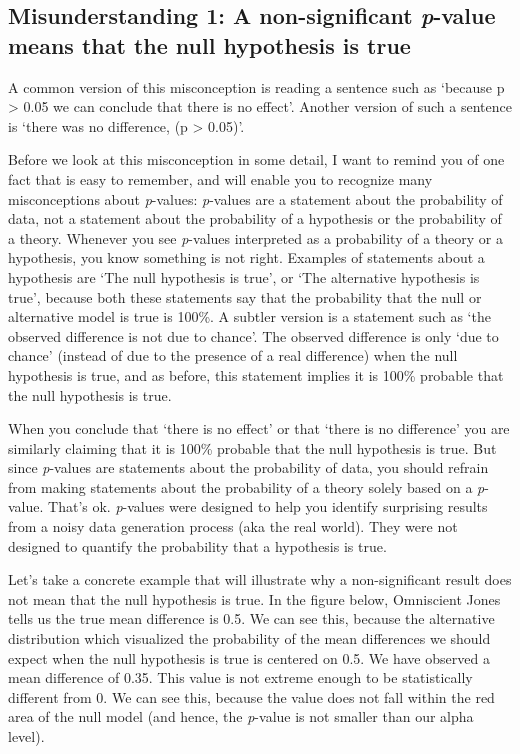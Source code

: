 \documentclass[
]{krantz}
\begin{document}
\hypertarget{misconception1}{%
\subsection{\texorpdfstring{Misunderstanding 1: A non-significant \emph{p}-value means that the null hypothesis is true}{Misunderstanding 1: A non-significant p-value means that the null hypothesis is true}}\label{misconception1}}

A common version of this misconception is reading a sentence such as `because p \textgreater{} 0.05 we can conclude that there is no effect'. Another version of such a sentence is `there was no difference, (p \textgreater{} 0.05)'.

Before we look at this misconception in some detail, I want to remind you of one fact that is easy to remember, and will enable you to recognize many misconceptions about \emph{p}-values: \emph{p}-values are a statement about the probability of data, not a statement about the probability of a hypothesis or the probability of a theory. Whenever you see \emph{p}-values interpreted as a probability of a theory or a hypothesis, you know something is not right. Examples of statements about a hypothesis are `The null hypothesis is true', or `The alternative hypothesis is true', because both these statements say that the probability that the null or alternative model is true is 100\%. A subtler version is a statement such as `the observed difference is not due to chance'. The observed difference is only `due to chance' (instead of due to the presence of a real difference) when the null hypothesis is true, and as before, this statement implies it is 100\% probable that the null hypothesis is true.

When you conclude that `there is no effect' or that `there is no difference' you are similarly claiming that it is 100\% probable that the null hypothesis is true. But since \emph{p}-values are statements about the probability of data, you should refrain from making statements about the probability of a theory solely based on a \emph{p}-value. That's ok. \emph{p}-values were designed to help you identify surprising results from a noisy data generation process (aka the real world). They were not designed to quantify the probability that a hypothesis is true.

Let's take a concrete example that will illustrate why a non-significant result does not mean that the null hypothesis is true. In the figure below, Omniscient Jones tells us the true mean difference is 0.5. We can see this, because the alternative distribution which visualized the probability of the mean differences we should expect when the null hypothesis is true is centered on 0.5. We have observed a mean difference of 0.35. This value is not extreme enough to be statistically different from 0. We can see this, because the value does not fall within the red area of the null model (and hence, the \emph{p}-value is not smaller than our alpha level).
\end{document}
